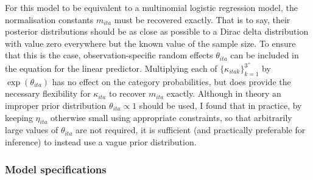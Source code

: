 \documentclass[a4paper, nobind]{templates/ociamthesis}
\begin{document}
For this model to be equivalent to a multinomial logistic regression model, the normalisation constants \(m_{ita}\) must be recovered exactly.
That is to say, their posterior distributions should be as close as possible to a Dirac delta distribution with value zero everywhere but the known value of the sample size.
To ensure that this is the case, observation-specific random effects \(\theta_{ita}\) can be included in the equation for the linear predictor.
Multiplying each of \(\{\kappa_{itak}\}_{k = 1}^{3^+}\) by \(\exp(\theta_{ita})\) has no effect on the category probabilities, but does provide the necessary flexibility for \(\kappa_{ita}\) to recover \(m_{ita}\) exactly.
Although in theory an improper prior distribution \(\theta_{ita} \propto 1\) should be used, I found that in practice, by keeping \(\eta_{ita}\) otherwise small using appropriate constraints, so that arbitrarily large values of \(\theta_{ita}\) are not required, it is sufficient (and practically preferable for inference) to instead use a vague prior distribution.

\hypertarget{model-specifications}{%
\subsubsection{Model specifications}\label{model-specifications}}
\end{document}
